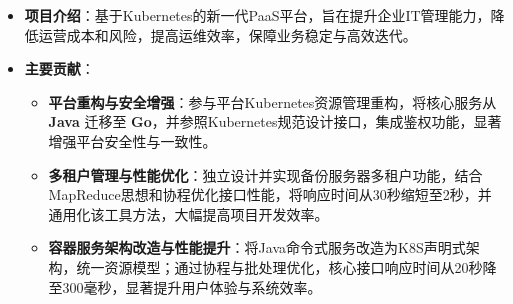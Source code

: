 \documentclass{resume}
\begin{document}
  \begin{itemize}[parsep=0.5ex]
    \item \textbf{项目介绍}：基于Kubernetes的新一代PaaS平台，旨在提升企业IT管理能力，降低运营成本和风险，提高运维效率，保障业务稳定与高效迭代。
    \item \textbf{主要贡献}：
      \begin{itemize}[leftmargin=*, parsep=0pt, itemsep=0.5ex, topsep=0.5ex]
        \item \textbf{平台重构与安全增强}：参与平台Kubernetes资源管理重构，将核心服务从 \textbf{Java} 迁移至 \textbf{Go}，并参照Kubernetes规范设计接口，集成鉴权功能，显著增强平台安全性与一致性。
        \item \textbf{多租户管理与性能优化}：独立设计并实现备份服务器多租户功能，结合MapReduce思想和协程优化接口性能，将响应时间从30秒缩短至2秒，并通用化该工具方法，大幅提高项目开发效率。
        \item \textbf{容器服务架构改造与性能提升}：将Java命令式服务改造为K8S声明式架构，统一资源模型；通过协程与批处理优化，核心接口响应时间从20秒降至300毫秒，显著提升用户体验与系统效率。
      \end{itemize}
  \end{itemize}
\end{document}
